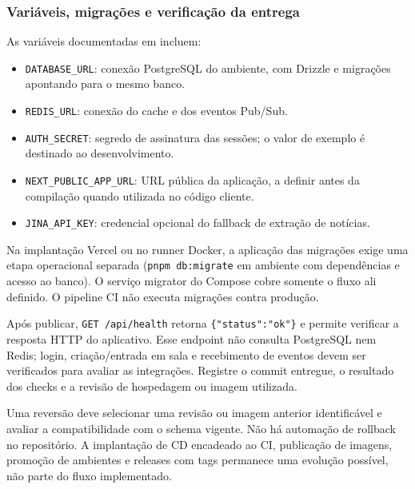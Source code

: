 \documentclass[12pt,a4paper]{article}
\begin{document}
\subsubsection{Variáveis, migrações e verificação da entrega}
As variáveis documentadas em  incluem:
\begin{itemize}
  \item \texttt{DATABASE\_URL}: conexão PostgreSQL do ambiente, com Drizzle e migrações apontando para o mesmo banco.
  \item \texttt{REDIS\_URL}: conexão do cache e dos eventos Pub/Sub.
  \item \texttt{AUTH\_SECRET}: segredo de assinatura das sessões; o valor de exemplo é destinado ao desenvolvimento.
  \item \texttt{NEXT\_PUBLIC\_APP\_URL}: URL pública da aplicação, a definir antes da compilação quando utilizada no código cliente.
  \item \texttt{JINA\_API\_KEY}: credencial opcional do fallback de extração de notícias.
\end{itemize}

Na implantação Vercel ou no runner Docker, a aplicação das migrações exige uma etapa operacional separada (\texttt{pnpm db:migrate} em ambiente com dependências e acesso ao banco). O serviço migrator do Compose cobre somente o fluxo ali definido. O pipeline CI não executa migrações contra produção.

Após publicar, \texttt{GET /api/health} retorna \texttt{\{"status":"ok"\}} e permite verificar a resposta HTTP do aplicativo. Esse endpoint não consulta PostgreSQL nem Redis; login, criação/entrada em sala e recebimento de eventos devem ser verificados para avaliar as integrações. Registre o commit entregue, o resultado dos checks e a revisão de hospedagem ou imagem utilizada.

Uma reversão deve selecionar uma revisão ou imagem anterior identificável e avaliar a compatibilidade com o schema vigente. Não há automação de rollback no repositório. A implantação de CD encadeado ao CI, publicação de imagens, promoção de ambientes e releases com tags permanece uma evolução possível, não parte do fluxo implementado.

\par
\endgroup

\newpage
\end{document}
